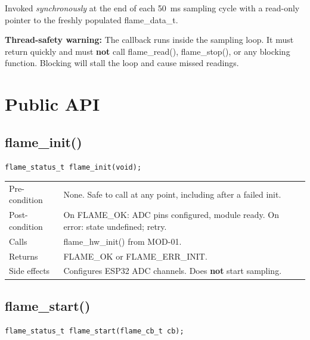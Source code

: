 \documentclass[12pt]{article}
\newcommand{\fn}[1]{{\footnotesize\ttfamily #1}}
\newcommand{\sectionrule}{%
  \vspace{2pt}{\color{headerblue}\rule{\linewidth}{1.5pt}}\vspace{6pt}}
\begin{document}
Invoked \emph{synchronously} at the end of each 50~ms sampling cycle with a read-only pointer to the freshly populated \fn{flame\_data\_t}.

\begin{warnbox}
\textbf{Thread-safety warning:} The callback runs inside the sampling loop. It must return quickly and must \textbf{not} call \fn{flame\_read()}, \fn{flame\_stop()}, or any blocking function. Blocking will stall the loop and cause missed readings.
\end{warnbox}

\section{Public API}
\sectionrule

\subsection{\fn{flame\_init()}}

\begin{lstlisting}[caption={Signature}]
flame_status_t flame_init(void);
\end{lstlisting}

\begin{table}[H]\centering\small
\begin{tabularx}{\textwidth}{L{3cm} X}
\toprule
Pre-condition  & None. Safe to call at any point, including after a failed init. \\
Post-condition & On \fn{FLAME\_OK}: ADC pins configured, module ready. On error: state undefined; retry. \\
Calls          & \fn{flame\_hw\_init()} from MOD-01. \\
Returns        & \fn{FLAME\_OK} or \fn{FLAME\_ERR\_INIT}. \\
Side effects   & Configures ESP32 ADC channels. Does \textbf{not} start sampling. \\
\bottomrule
\end{tabularx}
\end{table}

\subsection{\fn{flame\_start()}}

\begin{lstlisting}[caption={Signature}]
flame_status_t flame_start(flame_cb_t cb);
\end{lstlisting}
\end{document}
